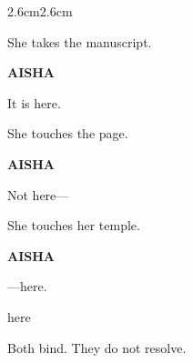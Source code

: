 \begin{adjustwidth}{2.6cm}{2.6cm}
\medskip

She takes the manuscript.

\medskip

\textbf{AISHA}

It is here.

\medskip


\medskip

She touches the page.

\medskip

\textbf{AISHA}

Not here---

\medskip

She touches her temple.

\medskip

\textbf{AISHA}

---here.

\medskip

 here \quad {}

\medskip

Both bind. They do not resolve.

\vspace{2em}


\vspace{2em}

\end{adjustwidth}

